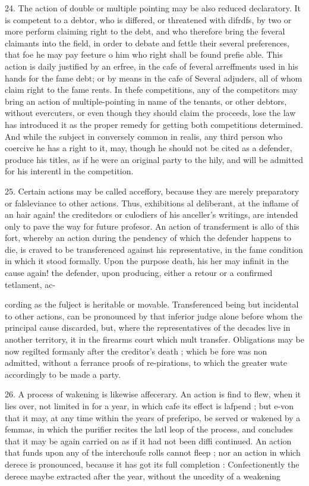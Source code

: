 \documentclass{article}
\begin{document}
24. The action of double or multiple pointing may be also reduced declaratory. It is competent to a debtor, who is differed, or threatened with difrdfs, by two or more perform claiming right to the debt, and who therefore bring the feveral claimants into the field, in order to debate and fettle their several preferences, that foe he may pay feeture o him who right shall be found prefie able. This action is daily justified by an erfree, in the cafe of feveral arreffments used in his hands for the fame debt; or by means in the cafe of Several adjuders, all of whom claim right to the fame rents. In thefe competitions, any of the competitors may bring an action of multiple-pointing in name of the tenants, or other debtors, without evercuters, or even though they should claim the proceeds, lose the law has introduced it as the proper remedy for getting both competitions determined. And while the subject in conversely common in realis, any third person who coercive he has a right to it, may, though he should not be cited as a defender, produce his titles, as if he were an original party to the hily, and will be admitted for his interentl in the competition.

25. Certain actions may be called acceffory, because they are merely preparatory or falsleviance to other actions. Thus, exhibitions al deliberant, at the inflame of an hair again! the creditedors or culodiers of his anceller's writings, are intended only to pave the way for future profesor. An action of transferment is allo of this fort, whereby an action during the pendency of which the defender happens to die, is craved to be transferenced against his representative, in the fame condition in which it stood formally. Upon the purpose death, his her may infinit in the cause again! the defender, upon producing, either a retour or a confirmed tetlament, ac-

cording as the fulject is heritable or movable. Transferenced being but incidental to other actions, can be pronounced by that inferior judge alone before whom the principal cause discarded, but, where the representatives of the decades live in another territory, it in the firearms court which mult transfer. Obligations may be now regilted formanly after the creditor's death ; which be fore was non admitted, without a ferrance proofs of re-pirations, to which the greater wate accordingly to be made a party.

26. A process of wakening is likewise affecerary. An action is find to flew, when it lies over, not limited in for a year, in which cafe its effect is lafpend ; but e-von that it may, at any time within the years of preferipo, be served or wakened by a femmas, in which the purifier recites the latl leop of the process, and concludes that it may be again carried on as if it had not been diffi continued. An action that funds upon any of the interchoufe rolls cannot fleep ; nor an action in which derece is pronounced, because it has got its full completion : Confectionently the derece maybe extracted after the year, without the uncedity of a weakening
\end{document}
